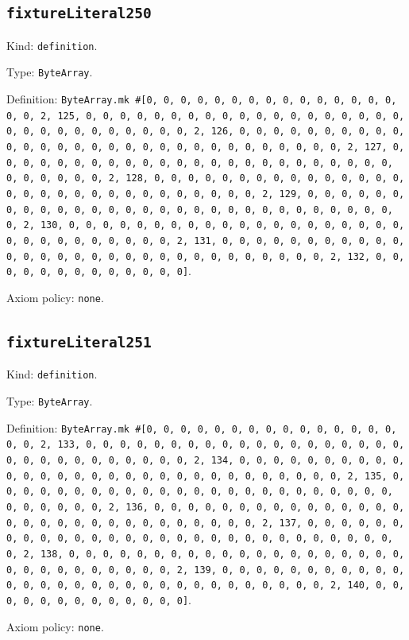 \documentclass[11pt]{article}
\begin{document}
\subsection*{\texttt{fixtureLiteral250}}
\noindent Kind: \texttt{definition}.\par
\noindent Type: \texttt{ByteArray}.\par
\noindent Definition: \texttt{ByteArray.mk \#[0, 0, 0, 0, 0, 0, 0, 0, 0, 0, 0, 0, 0, 0, 0, 0, 0, 2, 125, 0, 0, 0, 0, 0, 0, 0, 0, 0, 0, 0, 0, 0, 0, 0, 0, 0, 0, 0, 0, 0, 0, 0, 0, 0, 0, 0, 0, 0, 0, 2, 126, 0, 0, 0, 0, 0, 0, 0, 0, 0, 0, 0, 0, 0, 0, 0, 0, 0, 0, 0, 0, 0, 0, 0, 0, 0, 0, 0, 0, 0, 0, 2, 127, 0, 0, 0, 0, 0, 0, 0, 0, 0, 0, 0, 0, 0, 0, 0, 0, 0, 0, 0, 0, 0, 0, 0, 0, 0, 0, 0, 0, 0, 0, 2, 128, 0, 0, 0, 0, 0, 0, 0, 0, 0, 0, 0, 0, 0, 0, 0, 0, 0, 0, 0, 0, 0, 0, 0, 0, 0, 0, 0, 0, 0, 0, 2, 129, 0, 0, 0, 0, 0, 0, 0, 0, 0, 0, 0, 0, 0, 0, 0, 0, 0, 0, 0, 0, 0, 0, 0, 0, 0, 0, 0, 0, 0, 0, 2, 130, 0, 0, 0, 0, 0, 0, 0, 0, 0, 0, 0, 0, 0, 0, 0, 0, 0, 0, 0, 0, 0, 0, 0, 0, 0, 0, 0, 0, 0, 0, 2, 131, 0, 0, 0, 0, 0, 0, 0, 0, 0, 0, 0, 0, 0, 0, 0, 0, 0, 0, 0, 0, 0, 0, 0, 0, 0, 0, 0, 0, 0, 0, 2, 132, 0, 0, 0, 0, 0, 0, 0, 0, 0, 0, 0, 0, 0]}.\par
\noindent Axiom policy: \texttt{none}.\par
\subsection*{\texttt{fixtureLiteral251}}
\noindent Kind: \texttt{definition}.\par
\noindent Type: \texttt{ByteArray}.\par
\noindent Definition: \texttt{ByteArray.mk \#[0, 0, 0, 0, 0, 0, 0, 0, 0, 0, 0, 0, 0, 0, 0, 0, 0, 2, 133, 0, 0, 0, 0, 0, 0, 0, 0, 0, 0, 0, 0, 0, 0, 0, 0, 0, 0, 0, 0, 0, 0, 0, 0, 0, 0, 0, 0, 0, 0, 2, 134, 0, 0, 0, 0, 0, 0, 0, 0, 0, 0, 0, 0, 0, 0, 0, 0, 0, 0, 0, 0, 0, 0, 0, 0, 0, 0, 0, 0, 0, 0, 2, 135, 0, 0, 0, 0, 0, 0, 0, 0, 0, 0, 0, 0, 0, 0, 0, 0, 0, 0, 0, 0, 0, 0, 0, 0, 0, 0, 0, 0, 0, 0, 2, 136, 0, 0, 0, 0, 0, 0, 0, 0, 0, 0, 0, 0, 0, 0, 0, 0, 0, 0, 0, 0, 0, 0, 0, 0, 0, 0, 0, 0, 0, 0, 2, 137, 0, 0, 0, 0, 0, 0, 0, 0, 0, 0, 0, 0, 0, 0, 0, 0, 0, 0, 0, 0, 0, 0, 0, 0, 0, 0, 0, 0, 0, 0, 2, 138, 0, 0, 0, 0, 0, 0, 0, 0, 0, 0, 0, 0, 0, 0, 0, 0, 0, 0, 0, 0, 0, 0, 0, 0, 0, 0, 0, 0, 0, 0, 2, 139, 0, 0, 0, 0, 0, 0, 0, 0, 0, 0, 0, 0, 0, 0, 0, 0, 0, 0, 0, 0, 0, 0, 0, 0, 0, 0, 0, 0, 0, 0, 2, 140, 0, 0, 0, 0, 0, 0, 0, 0, 0, 0, 0, 0, 0]}.\par
\noindent Axiom policy: \texttt{none}.\par
\end{document}

